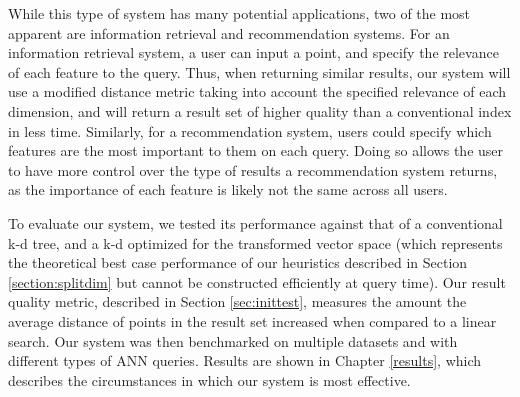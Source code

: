 While this type of system has many potential applications, two of the most apparent are   information retrieval and recommendation systems.  For an information retrieval system, a user can input a point, and specify the relevance of each feature to the query.  Thus, when returning similar results, our system will use a modified distance metric taking into account the specified relevance of each dimension, and will return a result set of higher quality than a conventional index in less time.  Similarly, for a recommendation system, users could specify which features are the most important to them on each query.  Doing so allows the user to have more control over the type of results a recommendation system returns, as the importance of each feature is likely not the same across all users.

To evaluate our system, we tested its performance against that of a conventional k-d tree, and a k-d optimized for the transformed vector space (which represents the theoretical best case performance of our heuristics described in Section \ref{section:splitdim} but cannot be constructed efficiently at query time).  Our result quality metric, described in Section \ref{sec:inittest}, measures the amount the average distance of points in the result set increased when compared to a linear search.  Our system was then benchmarked on multiple datasets and with different types of ANN queries.  Results are shown in Chapter \ref{results}, which describes the circumstances in which our system is most effective.